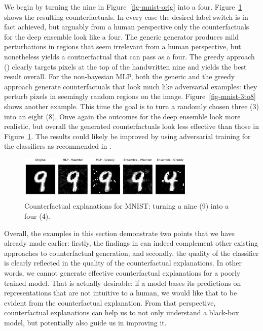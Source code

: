 \documentclass[
  letterpaper,
  DIV=11,
  numbers=noendperiod]{scrartcl}
\begin{document}
We begin by turning the nine in Figure~\ref{fig-mnist-orig} into a four.
Figure~\ref{fig-mnist-9to4} shows the resulting counterfactuals. In
every case the desired label switch is in fact achieved, but arguably
from a human perspective only the counterfactuals for the deep ensemble
look like a four. The generic generator produces mild perturbations in
regions that seem irrelevant from a human perspective, but nonetheless
yields a coutnerfactual that can pass as a four. The greedy approach
(\cite{schut2021generating}) clearly targets pixels at the top of the
handwritten nine and yields the best result overall. For the
non-bayesian MLP, both the generic and the greedy approach generate
counterfactuals that look much like adversarial examples: they perturb
pixels in seemingly random regions on the image.
Figure~\ref{fig-mnist-3to8} shows another example. This time the goal is
to turn a randomly chosen three (3) into an eight (8). Onve again the
outcomes for the deep ensemble look more realistic, but overall the
generated counterfactuals look less effective than those in
Figure~\ref{fig-mnist-9to4}. The results could likely be improved by
using adversarial training for the classifiers as recommended in
\cite{schut2021generating}.

\begin{figure}

{\centering \includegraphics[width=3.33333in,height=0.83333in]{www/mnist_9_to_4.png}

}

\caption{\label{fig-mnist-9to4}Counterfactual explanations for MNIST:
turning a nine (9) into a four (4).}

\end{figure}

Overall, the examples in this section demonstrate two points that we
have already made earlier: firstly, the findings in
\cite{schut2021generating} can indeed complement other existing
approaches to counterfactual generation; and secondly, the quality of
the classifier is clearly reflected in the quality of the counterfactual
explanations. In other words, we cannot generate effective
counterfactual explanations for a poorly trained model. That is actually
desirable: if a model bases its predictions on representations that are
not intuitive to a human, we would like that to be evident from the
counterfactual explanation. From that perspective, counterfactual
explanations can help us to not only understand a black-box model, but
potentially also guide us in improving it.
\end{document}
